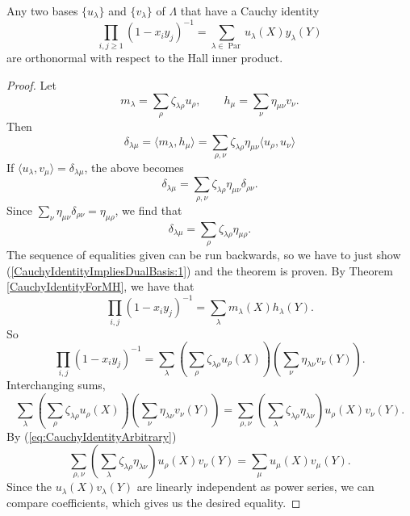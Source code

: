 \documentclass{article}
\DeclareMathOperator{\Par}{Par}
\begin{document}
\begin{theorem}\label{thm:CauchyIdentityImpliesOrthonormal}
    Any two bases $\{u_\lambda\}$ and $\{v_\lambda\}$ of $\Lambda$ that have a Cauchy identity
    \begin{equation}\label{eq:CauchyIdentityArbitrary}
        \prod_{i,j \geq 1}(1 - x_iy_j)^{-1} = \sum_{\lambda\in\Par} u_\lambda(X) y_\lambda(Y)
    \end{equation}
    are orthonormal with respect to the Hall inner product.
\end{theorem}

\begin{proof}
    Let
    \[
        m_\lambda = \sum_\rho \zeta_{\lambda\rho} u_\rho, \qquad h_\mu = \sum_\nu \eta_{\mu\nu} v_\nu.
    \]
    Then
    \[
        \delta_{\lambda\mu} = \langle m_\lambda, h_\mu \rangle = \sum_{\rho,\nu}\zeta_{\lambda\rho} \eta_{\mu\nu} \langle u_\rho, u_\nu \rangle
    \]
    If $\langle u_\lambda, v_\mu \rangle = \delta_{\lambda\mu}$, the above becomes
    \[
        \delta_{\lambda\mu} =  \sum_{\rho,\nu}\zeta_{\lambda\rho} \eta_{\mu\nu} \delta_{\rho\nu}.
    \]
    Since $\sum_\nu \eta_{\mu\nu}\delta_{\rho\nu} = \eta_{\mu\rho}$, we find that
    \begin{equation}\label{CauchyIdentityImpliesDualBasis:1}
        \delta_{\lambda\mu} =  \sum_\rho\zeta_{\lambda\rho} \eta_{\mu\rho}.
    \end{equation}
    The sequence of equalities given can be run backwards, so we have to just show (\ref{CauchyIdentityImpliesDualBasis:1}) and the theorem is proven.
    By Theorem \ref{CauchyIdentityForMH}, we have that
    \[
        \prod_{i,j}(1-x_iy_j)^{-1} = \sum_\lambda m_\lambda(X) h_\lambda(Y).
    \]
    So 
    \[
        \prod_{i,j}(1-x_iy_j)^{-1} = \sum_\lambda \left(\sum_\rho \zeta_{\lambda\rho} u_\rho(X)\right)\left(\sum_\nu \eta_{\lambda\nu}v_\nu(Y)\right).
    \]
    Interchanging sums,
    \[
        \sum_\lambda \left(\sum_\rho \zeta_{\lambda\rho} u_\rho(X)\right)\left(\sum_\nu \eta_{\lambda\nu}v_\nu(Y)\right) = \sum_{\rho,\nu} \left(\sum_\lambda \zeta_{\lambda\rho} \eta_{\lambda\nu}\right) u_\rho(X) v_\nu(Y).
    \]
    By (\ref{eq:CauchyIdentityArbitrary})
    \[
        \sum_{\rho,\nu} \left(\sum_\lambda \zeta_{\lambda\rho} \eta_{\lambda\nu}\right) u_\rho(X) v_\nu(Y) = \sum_\mu u_\mu(X) v_\mu(Y).
    \]
    Since the $u_\lambda(X)v_\lambda(Y)$ are linearly independent as power series, we can compare coefficients, which gives us the desired equality.
\end{proof}
\end{document}
